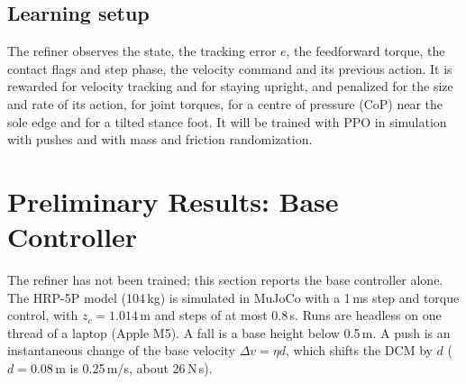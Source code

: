 \documentclass[conference]{IEEEtran}
\begin{document}
\subsection{Learning setup}
The refiner observes the state, the tracking error $e$, the feedforward torque, the contact flags and step phase, the velocity command and its previous action.
It is rewarded for velocity tracking and for staying upright, and penalized for the size and rate of its action, for joint torques, for a centre of pressure (CoP) near the sole edge and for a tilted stance foot.
It will be trained with PPO \cite{schulman2017ppo} in simulation with pushes and with mass and friction randomization.

\section{Preliminary Results: Base Controller}
\label{sec:results}

The refiner has not been trained; this section reports the base controller alone.
The HRP-5P model (104\,kg) is simulated in MuJoCo \cite{todorov2012mujoco} with a 1\,ms step and torque control, with $z_c=1.014$\,m and steps of at most 0.8\,s.
Runs are headless on one thread of a laptop (Apple M5).
A fall is a base height below 0.5\,m.
A push is an instantaneous change of the base velocity $\Delta v=\eta d$, which shifts the DCM by $d$ ($d=0.08$\,m is 0.25\,m/s, about 26\,N\,s).

\begin{table}[t]
\caption{Walking in simulation (base controller, no falls)}
\label{tab:walk}
\centering
\setlength{\tabcolsep}{3pt}
\end{table}
\end{document}
